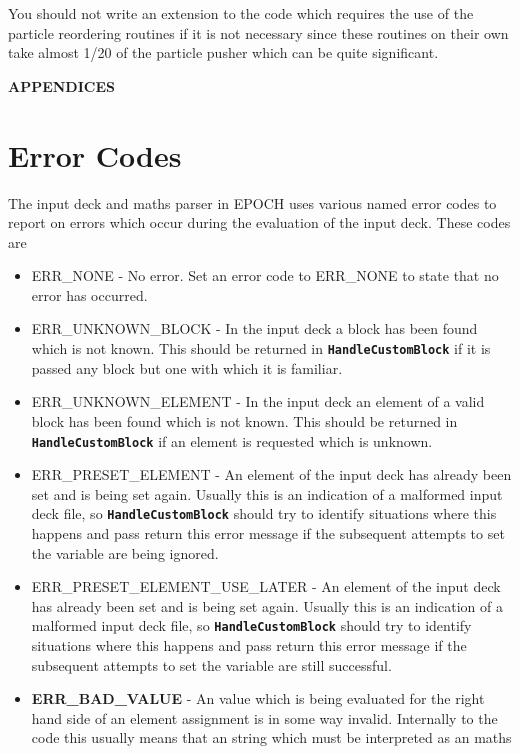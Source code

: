 \documentclass[12pt]{article}
\newcommand{\inlinecode}[1]{{\color{warwickred} \bf\texttt{#1}}}
\newcommand{\nEPOCH}{{\color{warwickdark}\fontfamily{phv}\selectfont EPOCH}}
\newcommand{\EPOCH}{{\nEPOCH} }
\begin{document}
You should not write an extension to the code which requires the use of the
particle reordering routines if it is not necessary since these routines on
their own take almost 1/20 of the particle pusher which can be quite
significant.

\pagebreak

\appendix
  \begin{center}
    {\bf APPENDICES}
  \end{center}
\section{Error Codes}
The input deck and maths parser in \EPOCH uses various named error codes to
report on errors which occur during the evaluation of the input deck. These
codes are
\begin{itemize}
\item ERR\_NONE - No error. Set an error code to ERR\_NONE to state that no
  error has occurred.
\item ERR\_UNKNOWN\_BLOCK - In the input deck a block has been found which is
  not known. This should be returned in \inlinecode{HandleCustomBlock} if it is
  passed any block but one with which it is familiar.
\item ERR\_UNKNOWN\_ELEMENT - In the input deck an element of a valid block has
  been found which is not known. This should be returned in
  \inlinecode{HandleCustomBlock} if an element is requested which is unknown.
\item ERR\_PRESET\_ELEMENT - An element of the input deck has already been set
  and is being set again. Usually this is an indication of a malformed input
  deck file, so \inlinecode{HandleCustomBlock} should try to identify
  situations where this happens and pass return this error message if the
  subsequent attempts to set the variable are being ignored.
\item ERR\_PRESET\_ELEMENT\_USE\_LATER - An element of the input deck has
  already been set and is being set again. Usually this is an indication of a
  malformed input deck file, so \inlinecode{HandleCustomBlock} should try to
  identify situations where this happens and pass return this error message if
  the subsequent attempts to set the variable are still successful.
\item {\bf ERR\_BAD\_VALUE} - An value which is being evaluated for the right
  hand side of an element assignment is in some way invalid. Internally to the
  code this usually means that an string which must be interpreted as an maths

\end{itemize}
\end{document}
